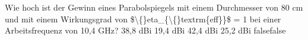     {Wie hoch ist der Gewinn eines Parabolspiegels mit einem Durchmesser von 80 cm und mit einem Wirkungsgrad von \$\textbackslash\{\}eta\_\{\textbackslash\{\}textrm\{eff\}\}\$ = 1 bei einer Arbeitsfrequenz von 10,4 GHz?}
    {38,8 dBi}
    {19,4 dBi}
    {42,4 dBi}
    {25,2 dBi}
    {false}{false}